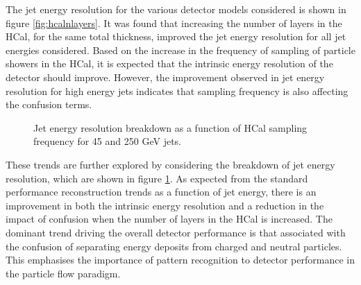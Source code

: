 The jet energy resolution for the various detector models considered is shown in figure \ref{fig:hcalnlayers}.  It was found that increasing the number of layers in the HCal, for the same total thickness, improved the jet energy resolution for all jet energies considered.  Based on the increase in the frequency of sampling of particle showers in the HCal, it is expected that the intrinsic energy resolution of the detector should improve.  However, the improvement observed in jet energy resolution for high energy jets indicates that sampling frequency is also affecting the confusion terms.

\begin{figure}
\centering
{}
\caption[Jet energy resolution breakdown as a function of HCal sampling frequency for 45 and 250 GeV jets.]{Jet energy resolution breakdown as a function of HCal sampling frequency for 45 and 250 GeV jets.}
\label{fig:hcalnlayersbreak}
\end{figure}

These trends are further explored by considering the breakdown of jet energy resolution, which are shown in figure \ref{fig:hcalnlayersbreak}.  As expected from the standard performance reconstruction trends as a function of jet energy, there is an improvement in both the intrinsic energy resolution and a reduction in the impact of confusion when the number of layers in the HCal is increased.  The dominant trend driving the overall detector performance is that associated with the confusion of separating energy deposits from charged and neutral particles.  This emphasises the importance of pattern recognition to detector performance in the particle flow paradigm.    


